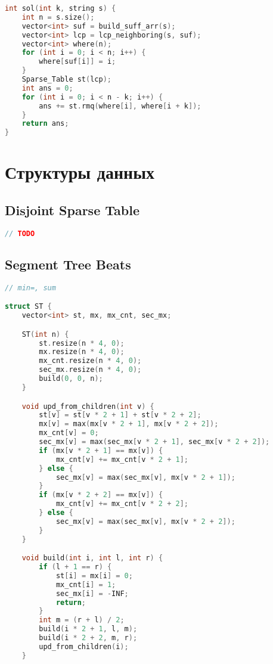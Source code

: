 \documentclass[10pt,a4paper,landscape,twosided]{extarticle}
\begin{document}
\begin{multicols}{3}
\begin{lstlisting}[language=C++]
int sol(int k, string s) {
    int n = s.size();
    vector<int> suf = build_suff_arr(s);
    vector<int> lcp = lcp_neighboring(s, suf);
    vector<int> where(n);
    for (int i = 0; i < n; i++) {
        where[suf[i]] = i;
    }
    Sparse_Table st(lcp);
    int ans = 0;
    for (int i = 0; i < n - k; i++) {
        ans += st.rmq(where[i], where[i + k]);
    }
    return ans;
}

\end{lstlisting}

\section{Структуры данных}

\subsection{Disjoint Sparse Table}
\begin{lstlisting}[language=C++]
// TODO
\end{lstlisting}

\subsection{Segment Tree Beats}
\begin{lstlisting}[language=C++]
// min=, sum

struct ST {
    vector<int> st, mx, mx_cnt, sec_mx;

    ST(int n) {
        st.resize(n * 4, 0);
        mx.resize(n * 4, 0);
        mx_cnt.resize(n * 4, 0);
        sec_mx.resize(n * 4, 0);
        build(0, 0, n);
    }

    void upd_from_children(int v) {
        st[v] = st[v * 2 + 1] + st[v * 2 + 2];
        mx[v] = max(mx[v * 2 + 1], mx[v * 2 + 2]);
        mx_cnt[v] = 0;
        sec_mx[v] = max(sec_mx[v * 2 + 1], sec_mx[v * 2 + 2]);
        if (mx[v * 2 + 1] == mx[v]) {
            mx_cnt[v] += mx_cnt[v * 2 + 1];
        } else {
            sec_mx[v] = max(sec_mx[v], mx[v * 2 + 1]);
        }
        if (mx[v * 2 + 2] == mx[v]) {
            mx_cnt[v] += mx_cnt[v * 2 + 2];
        } else {
            sec_mx[v] = max(sec_mx[v], mx[v * 2 + 2]);
        }
    }

    void build(int i, int l, int r) {
        if (l + 1 == r) {
            st[i] = mx[i] = 0;
            mx_cnt[i] = 1;
            sec_mx[i] = -INF;
            return;
        }
        int m = (r + l) / 2;
        build(i * 2 + 1, l, m);
        build(i * 2 + 2, m, r);
        upd_from_children(i);
    }


\end{lstlisting}
\end{multicols}
\end{document}

